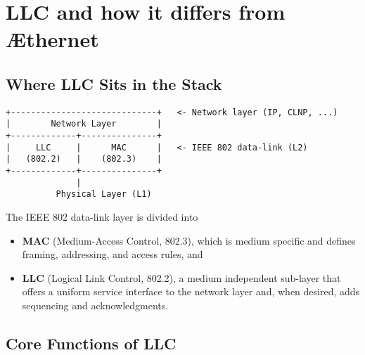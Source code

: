 \section{LLC and how it differs from \AE thernet}

\subsection{Where LLC Sits in the Stack}

\begin{verbatim}
+-----------------------------+   <- Network layer (IP, CLNP, ...)
|        Network Layer        |
+-------------+---------------+
|     LLC     |      MAC      |   <- IEEE 802 data-link (L2)
|   (802.2)   |    (802.3)    |
+-------------+---------------+
              |
          Physical Layer (L1)
\end{verbatim}

The IEEE 802 data-link layer is divided into

\begin{itemize}
  \item \textbf{MAC} (Medium-Access Control, 802.3), which is medium specific and defines framing, addressing, and access rules, and
  \item \textbf{LLC} (Logical Link Control, 802.2), a medium independent sub-layer that offers a uniform service interface to the network layer and, when desired, adds sequencing and acknowledgments.
\end{itemize}

\subsection{Core Functions of LLC}

